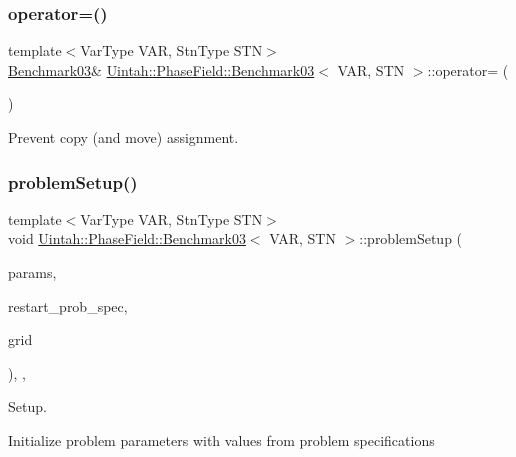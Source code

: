 \subsubsection{\texorpdfstring{operator=()}{operator=()}}
{\footnotesize\ttfamily template$<$Var\+Type V\+AR, Stn\+Type S\+TN$>$ \\
\hyperlink{classUintah_1_1PhaseField_1_1Benchmark03}{Benchmark03}\& \hyperlink{classUintah_1_1PhaseField_1_1Benchmark03}{Uintah\+::\+Phase\+Field\+::\+Benchmark03}$<$ V\+AR, S\+TN $>$\+::operator= (\begin{DoxyParamCaption}\item[{\hyperlink{classUintah_1_1PhaseField_1_1Benchmark03}{Benchmark03}$<$ V\+AR, S\+TN $>$ const \&}]{ }\end{DoxyParamCaption})\hspace{0.3cm}{\ttfamily [delete]}}



Prevent copy (and move) assignment. 

\mbox{\label{classUintah_1_1PhaseField_1_1Benchmark03_ac00a1530386dfec6ceac6fd596b137e1}} 
\subsubsection{\texorpdfstring{problem\+Setup()}{problemSetup()}}
{\footnotesize\ttfamily template$<$Var\+Type V\+AR, Stn\+Type S\+TN$>$ \\
void \hyperlink{classUintah_1_1PhaseField_1_1Benchmark03}{Uintah\+::\+Phase\+Field\+::\+Benchmark03}$<$ V\+AR, S\+TN $>$\+::problem\+Setup (\begin{DoxyParamCaption}\item[{Problem\+SpecP const \&}]{params,  }\item[{Problem\+SpecP const \&}]{restart\+\_\+prob\+\_\+spec,  }\item[{GridP \&}]{grid }\end{DoxyParamCaption})\hspace{0.3cm}{\ttfamily [override]}, {\ttfamily [protected]}, {\ttfamily [virtual]}}



Setup. 

Initialize problem parameters with values from problem specifications


